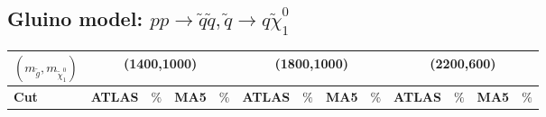 \documentclass[a4paper,11pt]{article}
\begin{document}
    \clearpage
		\begin{landscape}
			\subsection{Gluino model: $p p \rightarrow \tilde q \tilde q , \tilde q \rightarrow q \tilde \chi _1 ^0$}

			\begin{table}[h]
				\centering
				\renewcommand\arraystretch{1.0} 
				\scriptsize
				\begin{tabular}{ | l | c c c c  || c c c c || c c c c | } \toprule
					$(m_{\tilde g},m_{\tilde \chi _1 ^0})$ &	\multicolumn{4}{c}{\textbf{(1400,1000)}} & \multicolumn{4}{c}{\textbf{(1800,1000)}} &
					\multicolumn{4}{c|}{\textbf{(2200,600)}} \\ \hline 
					
			\textbf{Cut} & \textbf{ATLAS} & $\%$ & \textbf{MA5} & $\%$ & \textbf{ATLAS} & $\%$ & \textbf{MA5} & $\%$ & \textbf{ATLAS} & $\%$ & \textbf{MA5} & $\%$ \\ \hline \hline
					

\end{tabular}
\end{table}
\end{landscape}
\end{document}
